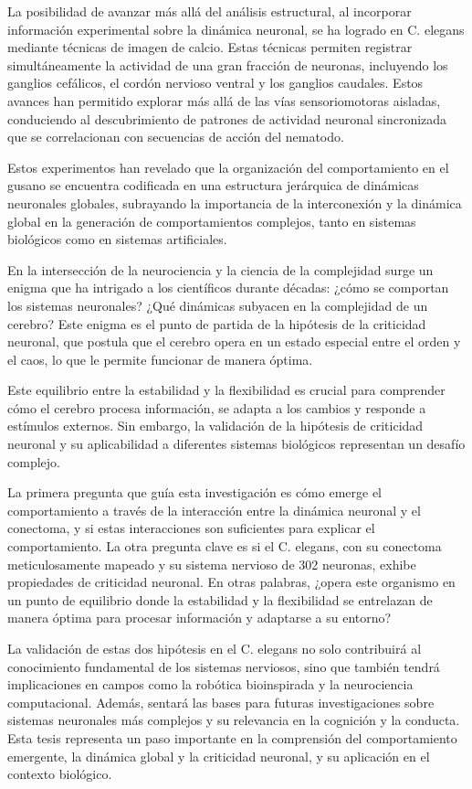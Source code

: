 La posibilidad de avanzar más allá del análisis estructural, al incorporar información experimental sobre la dinámica neuronal, se ha logrado en C. elegans mediante técnicas de imagen de calcio. Estas técnicas permiten registrar simultáneamente la actividad de una gran fracción de neuronas, incluyendo los ganglios cefálicos, el cordón nervioso ventral y los ganglios caudales. Estos avances han permitido explorar más allá de las vías sensoriomotoras aisladas, conduciendo al descubrimiento de patrones de actividad neuronal sincronizada que se correlacionan con secuencias de acción del nematodo.

Estos experimentos han revelado que la organización del comportamiento en el gusano se encuentra codificada en una estructura jerárquica de dinámicas neuronales globales, subrayando la importancia de la interconexión y la dinámica global en la generación de comportamientos complejos, tanto en sistemas biológicos como en sistemas artificiales. 

En la intersección de la neurociencia y la ciencia de la complejidad surge un enigma que ha intrigado a los científicos durante décadas: ¿cómo se comportan los sistemas neuronales? ¿Qué dinámicas subyacen en la complejidad de un cerebro? Este enigma es el punto de partida de la hipótesis de la criticidad neuronal, que postula que el cerebro opera en un estado especial entre el orden y el caos, lo que le permite funcionar de manera óptima.

Este equilibrio entre la estabilidad y la flexibilidad es crucial para comprender cómo el cerebro procesa información, se adapta a los cambios y responde a estímulos externos. Sin embargo, la validación de la hipótesis de criticidad neuronal y su aplicabilidad a diferentes sistemas biológicos representan un desafío complejo. 

La primera pregunta que guía esta investigación es cómo emerge el comportamiento a través de la interacción entre la dinámica neuronal y el conectoma, y si estas interacciones son suficientes para explicar el comportamiento. La otra pregunta clave es si el C. elegans, con su conectoma meticulosamente mapeado y su sistema nervioso de 302 neuronas, exhibe propiedades de criticidad neuronal. En otras palabras, ¿opera este organismo en un punto de equilibrio donde la estabilidad y la flexibilidad se entrelazan de manera óptima para procesar información y adaptarse a su entorno?

La validación de estas dos hipótesis en el C. elegans no solo contribuirá al conocimiento fundamental de los sistemas nerviosos, sino que también tendrá implicaciones en campos como la robótica bioinspirada y la neurociencia computacional. Además, sentará las bases para futuras investigaciones sobre sistemas neuronales más complejos y su relevancia en la cognición y la conducta. Esta tesis representa un paso importante en la comprensión del comportamiento emergente, la dinámica global y la criticidad neuronal, y su aplicación en el contexto biológico.


